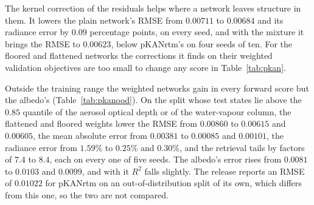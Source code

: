 \documentclass[11pt]{article}
\theoremstyle{remark}
\newcommand{\1}{\mathbf{1}}
\begin{document}
The kernel correction of the residuals helps where a network leaves structure in them. It lowers the plain network's
RMSE from $0.00711$ to $0.00684$ and its radiance error by $0.09$ percentage points, on every seed, and with the mixture
it brings the RMSE to $0.00623$, below pKANrtm's on four seeds of ten. For the floored and flattened networks the
corrections it finds on their weighted validation objectives are too small to change any score in Table~\ref{tab:pkan}.

\begin{table}[t]
\centering\footnotesize\setlength{\tabcolsep}{3pt}
\resizebox{\textwidth}{!}{}
\caption{The out-of-distribution split of the benchmark: the test block holds the $13{,}847$ states above the $0.85$
quantile of the aerosol optical depth or of the water-vapour column. The scores are those of Table~\ref{tab:pkan}. Mean
$\pm$ standard deviation over five seeds, which change the fitting and validation states and the initialization; the
test block is the same for all five.}\label{tab:pkanood}
\end{table}

Outside the training range the weighted networks gain in every forward score but the albedo's
(Table~\ref{tab:pkanood}). On the split whose test states lie above the $0.85$ quantile of the aerosol optical depth or
of the water-vapour column, the flattened and floored weights lower the RMSE from $0.00860$ to $0.00615$ and
$0.00605$, the mean absolute error from $0.00381$ to $0.00085$ and $0.00101$, the radiance error from $1.59\%$ to
$0.25\%$ and $0.30\%$, and the retrieval tails by factors of $7.4$ to $8.4$, each on every one of five seeds. The
albedo's error rises from $0.0081$ to $0.0103$ and $0.0099$, and with it $R^2$ falls slightly. The release reports an
RMSE of $0.01022$ for pKANrtm on an out-of-distribution split of its own, which differs from this one, so the two are
not compared.

\begin{table}[t]
\centering\footnotesize\setlength{\tabcolsep}{3pt}
\resizebox{\textwidth}{!}{}
\caption{The benchmark scored at four surface reflectances, from the saved test predictions of the networks of
Tables~\ref{tab:pkan} and~\ref{tab:pkanood}: the radiance error, the 95th percentiles of $|\hat\rho-\rho|$ in points on
the physical domain above $10^{-12}T_{\rm train}$ and $10^{-3}T_{\rm train}$, counting every failed inversion as an
infinite error, and the share of failed inversions there. Mean over the ten seeds of the release's split and the five
of the out-of-distribution split.}\label{tab:rhopkan}
\end{table}
\end{document}
